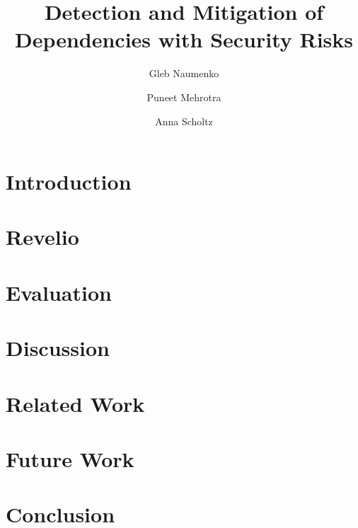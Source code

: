 \documentclass[sigconf]{acmart}
\begin{document}
\title{Detection and Mitigation of Dependencies with Security Risks}


\author{Gleb Naumenko}


\author{Puneet Mehrotra}


\author{Anna Scholtz}









\maketitle

\section{Introduction}
\label{sec:introduction}


\section{Revelio}
\label{sec:revelio}


\section{Evaluation}
\label{sec:evaluation}



\section{Discussion}
\label{sec:discussion}



\section{Related Work}
\label{sec:related-work}


\section{Future Work}
\label{sec:future-work}



\section{Conclusion}
\label{sec:conclusion}




\end{document}
